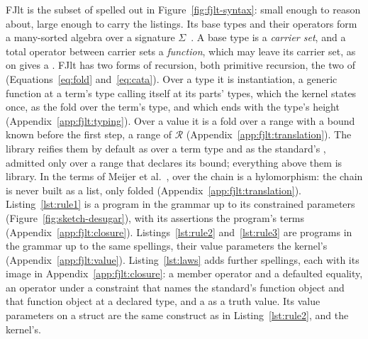FJlt is the subset of  spelled out in Figure~\ref{fig:fjlt-syntax}: small enough to reason about, large enough to carry the listings.
Its base types and their  operators form a many-sorted algebra over a signature $\Sigma$~\cite{birkhoff1970heterogeneous,sannella2012foundations}.
A base type is a \emph{carrier set}, and a total operator between carrier sets a \emph{function}, which may leave its carrier set, as \cppinline{==} on  gives a .
FJlt has two forms of recursion, both primitive recursion, the two of \RuleThree{} (Equations~\eqref{eq:fold} and~\eqref{eq:cata}).
Over a type it is instantiation, a generic function at a term's type calling itself at its parts' types, which the kernel states once, as the fold over the term's type, and which ends with the type's height (Appendix~\ref{app:fjlt:typing}).
Over a value it is a fold over a range with a bound known before the first step, a range of $\mathcal{R}$ (Appendix~\ref{app:fjlt:translation}).
The library reifies them by default as  over a term type and as the standard's , admitted only over a range that declares its bound; everything above them is library.
In the terms of Meijer et al.~\cite{meijer1991functional},  over the chain is a hylomorphism: the chain is never built as a list, only folded (Appendix~\ref{app:fjlt:translation}).
Listing~\ref{lst:rule1} is a program in the grammar up to its constrained parameters (Figure~\ref{fig:sketch-desugar}), with its assertions the program's terms (Appendix~\ref{app:fjlt:closure}).
Listings~\ref{lst:rule2} and~\ref{lst:rule3} are programs in the grammar up to the same spellings, their value parameters the kernel's (Appendix~\ref{app:fjlt:value}).
Listing~\ref{lst:laws} adds further spellings, each with its image in Appendix~\ref{app:fjlt:closure}: a member operator and a defaulted equality, an operator under a constraint that names the standard's function object and that function object at a declared type, and a  as a truth value.
Its value parameters on a struct are the same construct as in Listing~\ref{lst:rule2}, and the kernel's.

